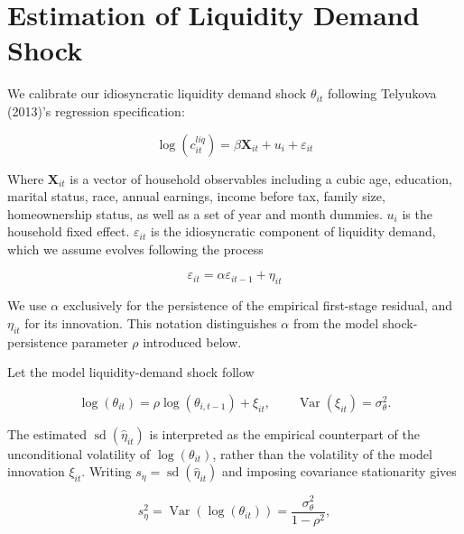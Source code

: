 \documentclass[11pt]{article}
\begin{document}
\section{Estimation of Liquidity Demand Shock}

We calibrate our idiosyncratic liquidity demand shock $\theta_{it}$ following Telyukova (2013)'s regression specification: 

\begin{equation}
	\label{eqn:telyukova_first_stage}
	\log(c^{liq}_{it}) = \beta \textbf{X}_{it} + u_i + \varepsilon_{it}
\end{equation}

Where $\textbf{X}_{it}$ is a vector of household observables including a cubic age, education, marital status, race, annual earnings, income before tax, family size, homeownership status, as well as a set of year and month dummies. $u_i$ is the household fixed effect. $\varepsilon_{it}$ is the idiosyncratic component of liquidity demand, which we assume evolves following the process

\begin{equation}
	\label{eqn:telyukova_second_stage}
	\varepsilon_{it} = \alpha \varepsilon_{it-1} + \eta_{it}
\end{equation}

We use $\alpha$ exclusively for the persistence of the empirical first-stage residual, and $\eta_{it}$ for its innovation. This notation distinguishes $\alpha$ from the model shock-persistence parameter $\rho$ introduced below.

Let the model liquidity-demand shock follow

\begin{equation}
	\label{eqn:model_liquidity_shock}
	\log(\theta_{it})
	= \rho\log(\theta_{i,t-1}) + \xi_{it},
	\qquad
	\operatorname{Var}(\xi_{it})=\sigma_\theta^2.
\end{equation}

The estimated $\operatorname{sd}(\widehat{\eta}_{it})$ is interpreted as the empirical counterpart of the unconditional volatility of $\log(\theta_{it})$, rather than the volatility of the model innovation $\xi_{it}$. Writing $s_\eta=\operatorname{sd}(\widehat{\eta}_{it})$ and imposing covariance stationarity gives

\begin{equation}
	\label{eqn:model_liquidity_shock_variance}
	s_\eta^2
	= \operatorname{Var}(\log(\theta_{it}))
	= \frac{\sigma_{\theta}^2}{1-\rho^2},
\end{equation}
\end{document}

